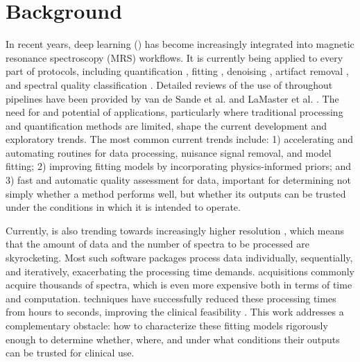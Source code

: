 \section{Background}\label{sec:background}
In recent years, deep learning (\DL) has become increasingly integrated into magnetic resonance spectroscopy (MRS) workflows. It is currently being applied to every part of \MRS protocols, including quantification \cite{Shamaei2023, Chen2023a, Wu2026}, fitting \cite{Shamaei2023, Shamaei2025}, denoising \cite{Wang2023}, artifact removal \cite{Gudmundson2023a, Kyathanahally2018, Tapper2021, Merkofer2025}, and spectral quality classification \cite{Kyathanahally2018a,Jang2021}. Detailed reviews of the use of \AI throughout \MRS pipelines have been provided by van de Sande et al. \cite{VandeSande2023} and LaMaster et al. \cite{LaMaster2026}. The need for and potential of \DL applications, particularly where traditional processing and quantification methods are limited, shape the current development and exploratory trends. The most common current trends include: 1) accelerating and automating routines for data processing, nuisance signal removal, and model fitting; 2) improving \DL fitting models by incorporating physics-informed priors; and 3) fast and automatic quality assessment for \MRS data, important for determining not simply whether a method performs well, but whether its outputs can be trusted under the conditions in which it is intended to operate. 

Currently, \MRS is also trending towards increasingly higher resolution \MRSI, which means that the amount of data and the number of spectra to be processed are skyrocketing. Most such software packages process data individually, sequentially, and iteratively, exacerbating the processing time demands. \MRSI acquisitions commonly acquire thousands of spectra, which is even more expensive both in terms of time and computation. \DL techniques have successfully reduced these processing times from hours to seconds, improving the clinical feasibility \MRSI. This work addresses a complementary obstacle: how to characterize these \DL fitting models rigorously enough to determine whether, where, and under what conditions their outputs can be trusted for clinical use.

